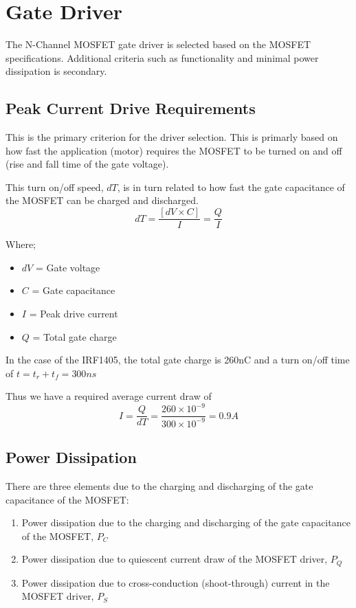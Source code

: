 \documentclass[a4paper]{article}
\begin{document}
\section{Gate Driver}
The N-Channel MOSFET gate driver is selected based on the MOSFET specifications.
Additional criteria such as functionality and minimal power dissipation is
secondary.

\subsection{Peak Current Drive Requirements}
This is the primary criterion for the driver selection. This is primarly based
on how fast the application (motor) requires the MOSFET to be turned on and off
(rise and fall time of the gate voltage).

This turn on/off speed, $dT$, is in turn related to how fast the gate
capacitance of the MOSFET can be charged and discharged.
    \begin{equation}
    dT = \frac{\left[ dV \times C\right]}{I} = \frac{Q}{I}
    \end{equation}

Where;
    \begin{itemize}
    \item $dV$ = Gate voltage
    \item $C$ = Gate capacitance
    \item $I$ = Peak drive current
    \item $Q$ = Total gate charge
    \end{itemize}

In the case of the IRF1405, the total gate charge is  260nC and a turn on/off time of $t = t_r + t_f =
300ns$

Thus we have a required average current draw of
    \begin{equation}
    I = \frac{Q}{dT} = \frac{260 \times 10^{-9}}{300 \times 10^{-9}} = 0.9A
    \end{equation}

\subsection{Power Dissipation}
There are three elements due to the charging and discharging of the gate
capacitance of the MOSFET:
    \begin{enumerate}
    \item Power dissipation due to the charging and discharging of the gate
    capacitance of the MOSFET, $P_C$
    \item Power dissipation due to quiescent current draw of the MOSFET driver,
    $P_Q$
    \item Power dissipation due to cross-conduction (shoot-through) current in
    the MOSFET driver, $P_S$
    \end{enumerate}
\end{document}
